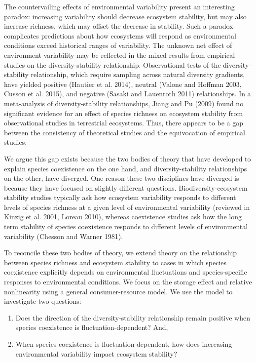 \documentclass[12pt,]{article}
\begin{document}
The countervailing effects of environmental variability present an
interesting paradox: increasing variability should decrease ecosystem
stability, but may also increase richness, which may offset the decrease
in stability. Such a paradox complicates predictions about how
ecosystems will respond as environmental conditions exceed historical
ranges of variability. The unknown net effect of environment variability
may be reflected in the mixed results from empirical studies on the
diversity-stability relationship. Observational tests of the
diversity-stability relationship, which require sampling across natural
diversity gradients, have yielded positive (Hautier et al. 2014),
neutral (Valone and Hoffman 2003, Cusson et al. 2015), and negative
(Sasaki and Lauenroth 2011) relationships. In a meta-analysis of
diversity-stability relationships, Jiang and Pu (2009) found no
significant evidence for an effect of species richness on ecosystem
stability from observational studies in terrestrial ecosystems. Thus,
there appears to be a gap between the consistency of theoretical studies
and the equivocation of empirical studies.

We argue this gap exists because the two bodies of theory that have
developed to explain species coexistence on the one hand, and
diversity-stability relationships on the other, have diverged. One
reason these two disciplines have diverged is because they have focused
on slightly different questions. Biodiversity-ecosystem stability
studies typically ask how ecosystem variability responds to different
levels of species richness at a given level of environmental variability
(reviewed in Kinzig et al. 2001, Loreau 2010), whereas coexistence
studies ask how the long term stability of species coexistence responds
to different levels of environmental variability (Chesson and Warner
1981).

To reconcile these two bodies of theory, we extend theory on the
relationship between species richness and ecosystem stability to cases
in which species coexistence explicitly depends on environmental
fluctuations and species-specific responses to environmental conditions.
We focus on the storage effect and relative nonlinearity using a general
consumer-resource model. We use the model to investigate two questions:

\begin{enumerate}
\def\labelenumi{\arabic{enumi}.}
\item
  Does the direction of the diversity-stability relationship remain
  positive when species coexistence is fluctuation-dependent? And,
\item
  When species coexistence is fluctuation-dependent, how does increasing
  environmental variability impact ecosystem stability?
\end{enumerate}
\end{document}
